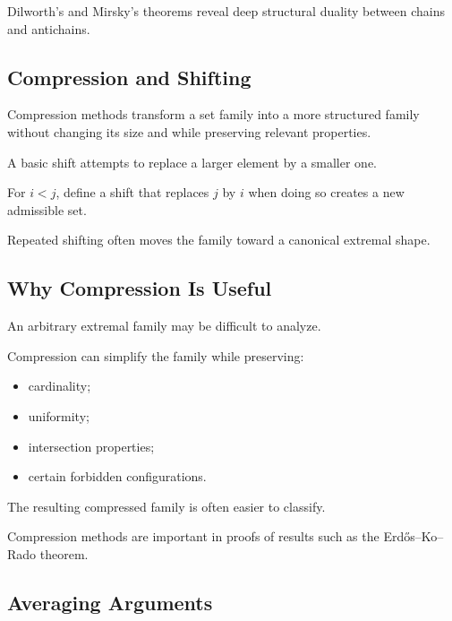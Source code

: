 Dilworth's and Mirsky's theorems reveal deep structural duality between
chains and antichains.

\subsection{Compression and Shifting}
\label{subsec:compression-shifting}

Compression methods transform a set family into a more structured
family without changing its size and while preserving relevant
properties.

A basic shift attempts to replace a larger element by a smaller one.

For \(i<j\), define a shift that replaces \(j\) by \(i\) when doing so
creates a new admissible set.

Repeated shifting often moves the family toward a canonical extremal
shape.

\subsection{Why Compression Is Useful}
\label{subsec:why-compression-useful}

An arbitrary extremal family may be difficult to analyze.

Compression can simplify the family while preserving:

\begin{itemize}
    \item cardinality;
    \item uniformity;
    \item intersection properties;
    \item certain forbidden configurations.
\end{itemize}

The resulting compressed family is often easier to classify.

Compression methods are important in proofs of results such as the
Erd\H{o}s--Ko--Rado theorem.

\subsection{Averaging Arguments}
\label{subsec:averaging-extremal}

